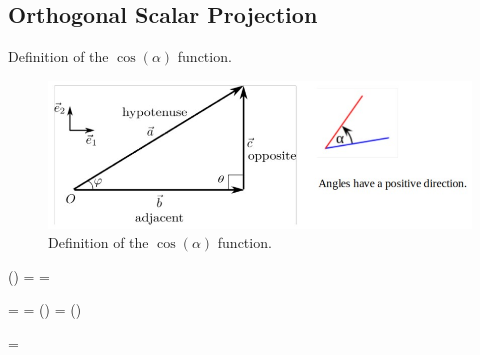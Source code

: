 \documentclass{article}
\begin{document}













\subsection{Orthogonal Scalar Projection}

Definition of the $\cos(\alpha)$ function.


\begin{figure}[!htbp]
\centering
\includegraphics[scale=0.5]{cosine_angle2}
\caption{Definition of the $\cos(\alpha)$ function.}\label{cosine_pic}
\end{figure}


\beq \label{cosine_definition}
\cos(\varphi) =  = 
\eeq

\beq \label{simple_scalar_projection}
\vert {} \vert =  =  \cdot \cos(\varphi) =  \vert {} \vert \cdot \cos(\varphi)
\eeq


\beq 
\vert {} \vert = \vert {} \vert \sin \varphi
\eeq
\end{document}
